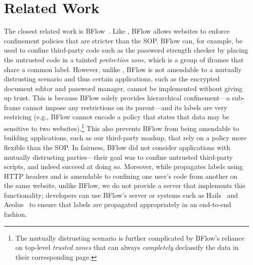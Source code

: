 \section{Related Work}
\label{sec:related}

The closest related work is BFlow~\cite{Yip:2009:PBS}.
%
Like \sys{}, BFlow allows websites to enforce confinement policies
that are stricter than the SOP.
%
BFlow can, for example, be used to confine third-party code such as
the password strength checker by placing the untrusted code in a
tainted \emph{protection zone}, which is a group of iframes that share
a common label.
%
However, unlike \sys{}, BFlow is not amendable to a mutually
distrusting scenario and thus certain applications, such as the
encrypted document editor and password manager, cannot be implemented
without giving up trust.
%
This is because BFlow solely provides hierarchical confinement---a
sub-frame cannot impose any restrictions on its parent---and its
labels are very restricing (e.g., BFlow cannot encode a policy that
states that data may be sensitive to two websites).\footnote{
The mutually distrusting scenario is further complicated by BFlow's
reliance on top-level \emph{trusted zones} that can always
\emph{completely} declassify the data in their corresponding page.}
%
This also prevents BFlow from being amendable to building
applications, such as our third-party mashup, that rely on a policy
more flexible than the SOP.
%
In fairness, BFlow did not consider applications with mutually
distrusting parties---their goal was to confine untrusted third-party
scripts, and indeed succeed at doing so.
%
Moreover, while \sys{} propagates labels using HTTP headers and is
amendable to confining one user's code from another on the same
website, unlike BFlow, we do not provide a server that implements this
functionality; developers can use BFlow's server or systems such as
Hails~\cite{giffin:2012:hails} and Aeolus~\cite{cheng:aeolus} to
ensure that labels are propagated appropriately in an end-to-end
fashion.
%



